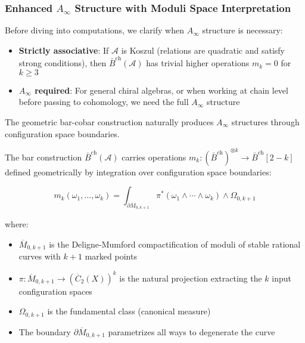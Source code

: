 \subsubsection{Enhanced $A_\infty$ Structure with Moduli Space Interpretation}

\begin{remark}
Before diving into computations, we clarify when $A_\infty$ structure is necessary:
\begin{itemize}
\item \textbf{Strictly associative}: If $\mathcal{A}$ is Koszul (relations are 
quadratic and satisfy strong conditions), then $\bar{B}^{\text{ch}}(\mathcal{A})$ 
has trivial higher operations $m_k = 0$ for $k \geq 3$
\item \textbf{$A_\infty$ required}: For general chiral algebras, or when working 
at chain level before passing to cohomology, we need the full $A_\infty$ structure
\end{itemize}
The geometric bar-cobar construction naturally produces $A_\infty$ structures 
through configuration space boundaries.
\end{remark}

\begin{theorem}\label{thm:ainfty-moduli}
The bar construction $\bar{B}^{\text{ch}}(\mathcal{A})$ carries operations 
$m_k: (\bar{B}^{\text{ch}})^{\otimes k} \to \bar{B}^{\text{ch}}[2-k]$ defined 
geometrically by integration over configuration space boundaries:

$$m_k(\omega_1, \ldots, \omega_k) = \int_{\partial \overline{M}_{0,k+1}} 
\pi^*(\omega_1 \wedge \cdots \wedge \omega_k) \wedge \Omega_{0,k+1}$$

where:
\begin{itemize}
\item $\overline{M}_{0,k+1}$ is the Deligne-Mumford compactification of moduli 
of stable rational curves with $k+1$ marked points
\item $\pi: \overline{M}_{0,k+1} \to (\overline{C}_2(X))^k$ is the natural 
projection extracting the $k$ input configuration spaces
\item $\Omega_{0,k+1}$ is the fundamental class (canonical measure)
\item The boundary $\partial \overline{M}_{0,k+1}$ parametrizes all ways to 
degenerate the curve
\end{itemize}
\end{theorem}

